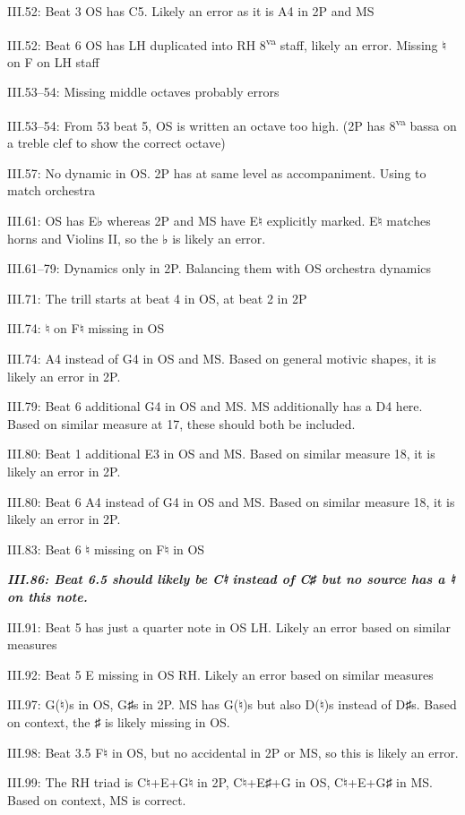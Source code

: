 \documentclass[twoside]{article}
\newcommand\dynmark[1]{\scalebox{0.9}{#1}{\kern1pt}}
\begin{document}
\begin{hangparas}{15pt}{1}
\begin{multicols}{2}
III.52: Beat 3 OS has C5. Likely an error as it is A4 in 2P and MS

III.52: Beat 6 OS has LH duplicated into RH 8\textsuperscript{va} staff, likely an error. Missing ♮ on F on LH staff

III.53--54: Missing middle octaves probably errors

III.53--54: From 53 beat 5, OS is written an octave too high. (2P has 8\textsuperscript{va} bassa on a treble clef to show the correct octave)

III.57: No dynamic in OS. 2P has \dynmark{\pp} at same level as accompaniment. Using \dynmark{\p} to match orchestra

III.61: OS has E♭ whereas 2P and MS have E♮ explicitly marked. E♮ matches horns and Violins II, so the ♭ is likely an error.

III.61--79: Dynamics only in 2P. Balancing them with OS orchestra dynamics

III.71: The trill starts at beat 4 in OS, at beat 2 in 2P

III.74: ♮ on F♮ missing in OS

III.74: A4 instead of G4 in OS and MS. Based on general motivic shapes, it is likely an error in 2P.

III.79: Beat 6 additional G4 in OS and MS. MS additionally has a D4 here. Based on similar measure at 17, these should both be included.

III.80: Beat 1 additional E3 in OS and MS. Based on similar measure 18, it is likely an error in 2P.

III.80: Beat 6 A4 instead of G4 in OS and MS. Based on similar measure 18, it is likely an error in 2P.

III.83: Beat 6 ♮ missing on F♮ in OS

\textbf{\textit{III.86: Beat 6.5 should likely be C♮ instead of C♯ but no source has a ♮ on this note.}}

III.91: Beat 5 has just a quarter note in OS LH. Likely an error based on similar measures

III.92: Beat 5 E missing in OS RH. Likely an error based on similar measures

III.97: G(♮)s in OS, G♯s in 2P. MS has G(♮)s but also D(♮)s instead of D♯s. Based on context, the ♯ is likely missing in OS.

III.98: Beat 3.5 F♮ in OS, but no accidental in 2P or MS, so this is likely an error.

III.99: The RH triad is C♮+E+G♮ in 2P, C♮+E♯+G in OS, C♮+E+G♯ in MS. Based on context, MS is correct.


\end{multicols}
\end{hangparas}
\end{document}
